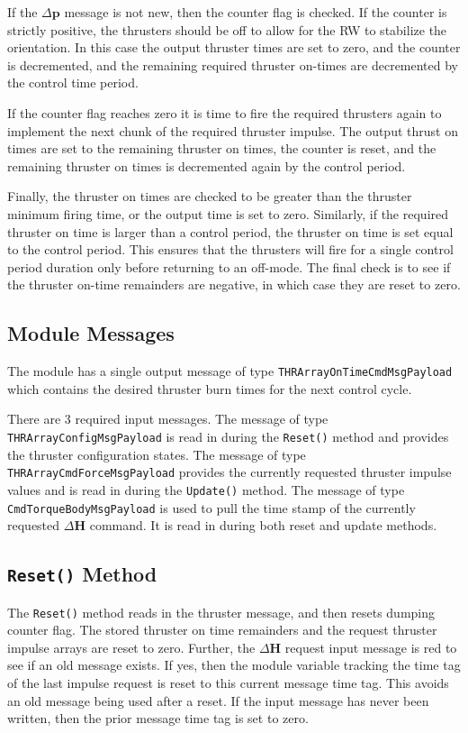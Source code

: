 \documentclass[]{BasiliskReportMemo}
\begin{document}
If the $\Delta\bm p$ message is not new, then the counter flag is checked.  If the counter is strictly positive, the thrusters should be off to allow for the RW to stabilize the orientation.  In this case the output thruster times are set to zero, and the counter is decremented, and the remaining required thruster on-times are decremented by the control time period.

If the counter flag reaches zero it is time to fire the required thrusters again to implement the next chunk of the required thruster impulse.  The output thrust on times are set to the remaining thruster on times, the counter is reset, and the remaining thruster on times is decremented again by the control period.

Finally, the thruster on times are checked to be greater than the thruster minimum firing time, or the output time is set to zero.  Similarly, if the required thruster on time is larger than a control period, the thruster on time is set equal to the control period.  This ensures that the thrusters will fire for a single control period duration only before returning to an off-mode.  The final check is to see if the thruster on-time remainders are negative, in which case they are reset to zero.







\subsection{Module Messages}
The module has a single output message of type {\tt THRArrayOnTimeCmdMsgPayload} which contains the desired thruster burn times for the next control cycle.

There are 3 required input messages.  The message of type {\tt THRArrayConfigMsgPayload} is read in during the {\tt Reset()} method and provides the thruster configuration states.  The message of type {\tt THRArrayCmdForceMsgPayload} provides the currently requested thruster impulse values and is read in during the {\tt Update()} method.  The message of type {\tt CmdTorqueBodyMsgPayload} is used to pull the time stamp of the currently requested $\Delta {\bm H}$ command.  It is read in during both reset and update methods.  

\subsection{{\tt Reset()} Method}
The {\tt Reset()} method reads in the thruster message, and then resets dumping counter flag.  The stored thruster on time remainders and the request thruster impulse arrays are reset to zero.  Further, the $\Delta\bm H$ request input message is red to see if an old message exists.  If yes, then the module variable tracking the time tag of the last impulse request is reset to this current message time tag. This avoids an old message being used after a reset.  If the input message has never been written, then the prior message time tag is set to zero.
\end{document}
